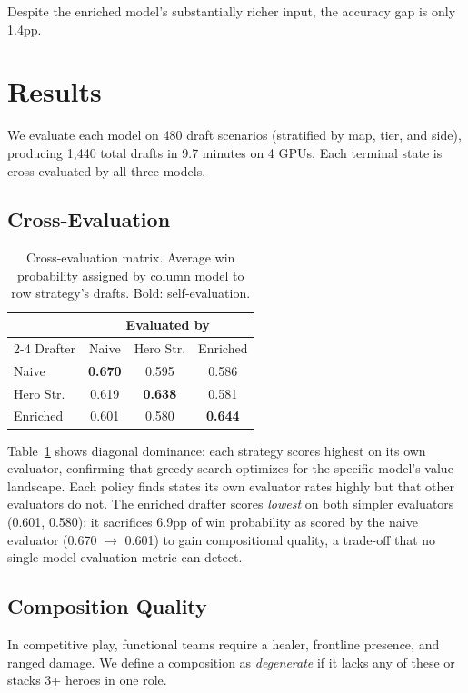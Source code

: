 \documentclass[conference]{IEEEtran}
\begin{document}
Despite the enriched model's substantially richer input, the accuracy gap is only 1.4pp.

\section{Results}

We evaluate each model on 480 draft scenarios (stratified by map, tier, and side), producing 1,440 total drafts in 9.7 minutes on 4 GPUs. Each terminal state is cross-evaluated by all three models.

\subsection{Cross-Evaluation}

\begin{table}[t]
\centering
\caption{Cross-evaluation matrix. Average win probability assigned by column model to row strategy's drafts. Bold: self-evaluation.}
\label{tab:crosseval}
\begin{tabular}{lccc}
\toprule
& \multicolumn{3}{c}{Evaluated by} \\
\cmidrule(lr){2-4}
Drafter & Naive & Hero Str. & Enriched \\
\midrule
Naive & \textbf{0.670} & 0.595 & 0.586 \\
Hero Str. & 0.619 & \textbf{0.638} & 0.581 \\
Enriched & 0.601 & 0.580 & \textbf{0.644} \\
\bottomrule
\end{tabular}
\end{table}

Table~\ref{tab:crosseval} shows diagonal dominance: each strategy scores highest on its own evaluator, confirming that greedy search optimizes for the specific model's value landscape. Each policy finds states its own evaluator rates highly but that other evaluators do not. The enriched drafter scores \textit{lowest} on both simpler evaluators (0.601, 0.580): it sacrifices 6.9pp of win probability as scored by the naive evaluator (0.670 $\to$ 0.601) to gain compositional quality, a trade-off that no single-model evaluation metric can detect.

\subsection{Composition Quality}

In competitive play, functional teams require a healer, frontline presence, and ranged damage. We define a composition as \textit{degenerate} if it lacks any of these or stacks 3+ heroes in one role.
\end{document}
